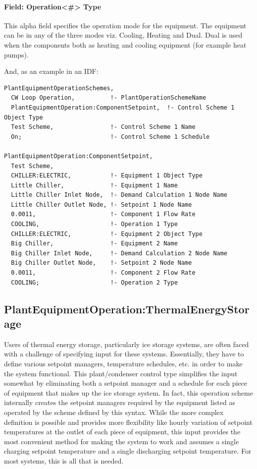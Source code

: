 \paragraph{Field: Operation\textless{}\#\textgreater{} Type}\label{field-operation-type}

This alpha field specifies the operation mode for the equipment. The equipment can be in any of the three modes viz. Cooling, Heating and Dual. Dual is used when the components both as heating and cooling equipment (for example heat pumps).

And, as an example in an IDF:

\begin{lstlisting}
PlantEquipmentOperationSchemes,
  CW Loop Operation,          !- PlantOperationSchemeName
  PlantEquipmentOperation:ComponentSetpoint,  !- Control Scheme 1 Object Type
  Test Scheme,                !- Control Scheme 1 Name
  On;                         !- Control Scheme 1 Schedule

PlantEquipmentOperation:ComponentSetpoint,
  Test Scheme,
  CHILLER:ELECTRIC,           !- Equipment 1 Object Type
  Little Chiller,             !- Equipment 1 Name
  Little Chiller Inlet Node,  !- Demand Calculation 1 Node Name
  Little Chiller Outlet Node, !- Setpoint 1 Node Name
  0.0011,                     !- Component 1 Flow Rate
  COOLING,                    !- Operation 1 Type
  CHILLER:ELECTRIC,           !- Equipment 2 Object Type
  Big Chiller,                !- Equipment 2 Name
  Big Chiller Inlet Node,     !- Demand Calculation 2 Node Name
  Big Chiller Outlet Node,    !- Setpoint 2 Node Name
  0.0011,                     !- Component 2 Flow Rate
  COOLING;                    !- Operation 2 Type
\end{lstlisting}

\subsection{PlantEquipmentOperation:ThermalEnergyStorage}\label{plantequipmentoperationthermalenergystorage}

Users of thermal energy storage, particularly ice storage systems, are often faced with a challenge of specifying input for these systems. Essentially, they have to define various setpoint managers, temperature schedules, etc. in order to make the system functional. This plant/condenser control type simplifies the input somewhat by eliminating both a setpoint manager and a schedule for each piece of equipment that makes up the ice storage system. In fact, this operation scheme internally creates the setpoint managers required by the equipment listed as operated by the scheme defined by this syntax. While the more complex definition is possible and provides more flexibility like hourly variation of setpoint temperatures at the outlet of each piece of equipment, this input provides the most convenient method for making the system to work and assumes a single charging setpoint temperature and a single discharging setpoint temperature. For most systems, this is all that is needed.

